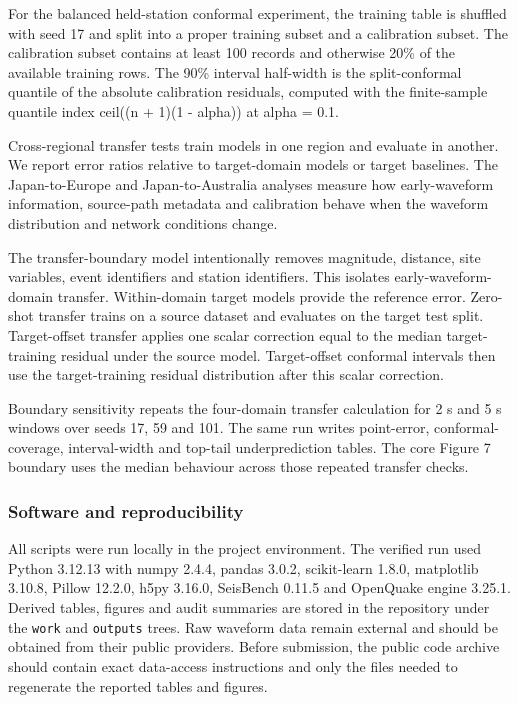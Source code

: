 \documentclass[
  10pt,
]{article}
\begin{document}
For the balanced held-station conformal experiment, the training table
is shuffled with seed 17 and split into a proper training subset and a
calibration subset. The calibration subset contains at least 100 records
and otherwise 20\% of the available training rows. The 90\% interval
half-width is the split-conformal quantile of the absolute calibration
residuals, computed with the finite-sample quantile index ceil((n + 1)(1
- alpha)) at alpha = 0.1.

Cross-regional transfer tests train models in one region and evaluate in
another. We report error ratios relative to target-domain models or
target baselines. The Japan-to-Europe and Japan-to-Australia analyses
measure how early-waveform information, source-path metadata and
calibration behave when the waveform distribution and network conditions
change.

The transfer-boundary model intentionally removes magnitude, distance,
site variables, event identifiers and station identifiers. This isolates
early-waveform-domain transfer. Within-domain target models provide the
reference error. Zero-shot transfer trains on a source dataset and
evaluates on the target test split. Target-offset transfer applies one
scalar correction equal to the median target-training residual under the
source model. Target-offset conformal intervals then use the
target-training residual distribution after this scalar correction.

Boundary sensitivity repeats the four-domain transfer calculation for 2
s and 5 s windows over seeds 17, 59 and 101. The same run writes
point-error, conformal-coverage, interval-width and top-tail
underprediction tables. The core Figure 7 boundary uses the median
behaviour across those repeated transfer checks.

\subsubsection{Software and
reproducibility}\label{software-and-reproducibility}

All scripts were run locally in the project environment. The verified
run used Python 3.12.13 with numpy 2.4.4, pandas 3.0.2, scikit-learn
1.8.0, matplotlib 3.10.8, Pillow 12.2.0, h5py 3.16.0, SeisBench 0.11.5
and OpenQuake engine 3.25.1. Derived tables, figures and audit summaries
are stored in the repository under the \texttt{work} and
\texttt{outputs} trees. Raw waveform data remain external and should be
obtained from their public providers. Before submission, the public code
archive should contain exact data-access instructions and only the files
needed to regenerate the reported tables and figures.
\end{document}
